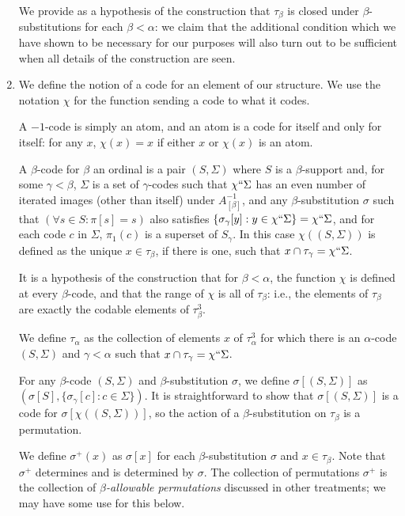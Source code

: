 \documentclass[12pt]{article}
\begin{document}
\begin{enumerate}
We provide as a hypothesis of the construction that $\tau_\beta$ is closed under $\beta$-substitutions for each $\beta<\alpha$:  we claim that the additional condition which we have shown to be necessary for our purposes will also turn out to be sufficient when all details of the construction are seen.

\item We define the notion of a code for an element of our structure.  We use the notation $\chi$ for the function sending a code to what it codes.

A $-1$-code is simply an atom, and an atom is a code for itself and only for itself:  for any $x$, $\chi(x)=x$ if either $x$ or $\chi(x)$ is an atom.

A  $\beta$-code for $\beta$ an ordinal is a pair $(S,\Sigma)$ where $S$ is a $\beta$-support and, for some $\gamma<\beta$, $\Sigma$ is a set of $\gamma$-codes such that $\chi``\Sigma$ has an even number of iterated images (other than itself) under $A_{[\beta]}^{-1}$, and any $\beta$-substitution $\sigma$ such that $(\forall s \in S:\pi[s]=s)$ also
satisfies $\{\sigma_\gamma[y]:y \in \chi``\Sigma\} = \chi``\Sigma$, and for each code $c$ in $\Sigma$, $\pi_1(c)$ is a superset of $S_\gamma$.  In this case $\chi((S,\Sigma))$ is defined as the unique $x\in \tau_\beta$, if there is one, such that $x \cap \tau_\gamma = \chi``\Sigma$.

It is a hypothesis of the construction that for $\beta<\alpha$, the function $\chi$ is defined at every $\beta$-code, and that the range of $\chi$ is all of $\tau_\beta$:  i.e., the elements of $\tau_\beta$ are exactly the codable elements of $\tau^3_\beta$.

We define $\tau_\alpha$ as the collection of elements $x$ of $\tau^3_\alpha$ for which there is an $\alpha$-code $(S,\Sigma)$ and $\gamma<\alpha$ such that $x \cap \tau_\gamma = \chi``\Sigma$.

For any $\beta$-code $(S,\Sigma)$ and $\beta$-substitution $\sigma$, we define $\sigma[(S,\Sigma)]$ as $(\sigma[S],\{\sigma_\gamma[c]:c \in \Sigma\})$.  It  is straightforward to show that $\sigma[(S,\Sigma)]$ is a code for $\sigma[\chi((S,\Sigma))]$, so the action of a $\beta$-substitution on $\tau_\beta$ is a permutation.

We define $\sigma^+(x)$ as $\sigma[x]$ for each $\beta$-substitution $\sigma$ and $x \in \tau_\beta$.  Note that $\sigma^+$ determines and is determined by $\sigma$.  The collection of permutations $\sigma^+$  is the collection of {\em $\beta$-allowable permutations\/} discussed in other treatments;
we may have some use for this below.



\end{enumerate}
\end{document}
